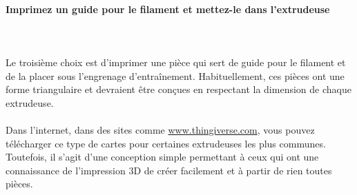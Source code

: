 \documentclass[11pt,a4paper]{article}
\begin{document}
			\paragraph{Imprimez un guide pour le filament et mettez-le dans l’extrudeuse}\mbox{}\\\\
Le troisième choix est d'imprimer une pièce qui sert de guide pour le filament et de la placer sous l’engrenage d’entraînement. Habituellement, ces pièces ont une forme triangulaire et devraient être conçues en respectant la dimension de chaque extrudeuse.
\\\\
Dans l’internet, dans des sites comme \url{www.thingiverse.com}, vous pouvez télécharger ce type de cartes pour certaines extrudeuses  les plus communes. Toutefois, il s’agit d’une conception simple permettant à ceux qui ont une connaissance de l’impression 3D de créer facilement et à partir de rien toutes pièces. 
\end{document}
